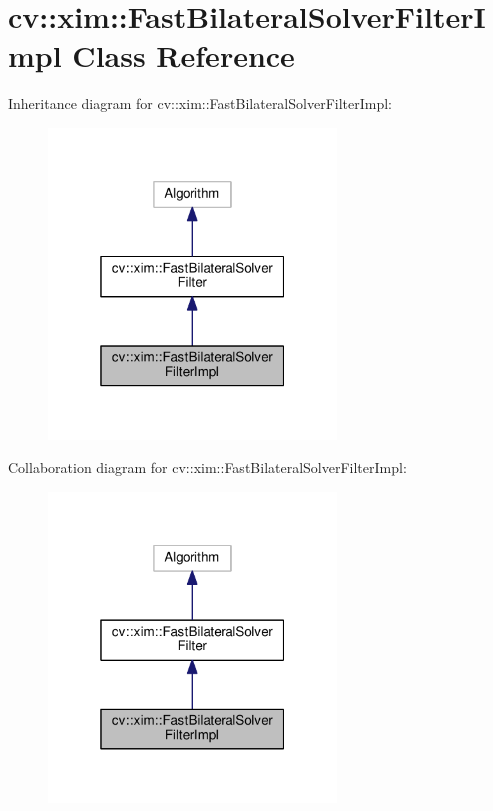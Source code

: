 \hypertarget{classcv_1_1xim_1_1FastBilateralSolverFilterImpl}{}\section{cv\+:\+:xim\+:\+:Fast\+Bilateral\+Solver\+Filter\+Impl Class Reference}
\label{classcv_1_1xim_1_1FastBilateralSolverFilterImpl}


Inheritance diagram for cv\+:\+:xim\+:\+:Fast\+Bilateral\+Solver\+Filter\+Impl\+:
\nopagebreak
\begin{figure}[H]
\begin{center}
\leavevmode
\includegraphics[width=217pt]{classcv_1_1xim_1_1FastBilateralSolverFilterImpl__inherit__graph}
\end{center}
\end{figure}


Collaboration diagram for cv\+:\+:xim\+:\+:Fast\+Bilateral\+Solver\+Filter\+Impl\+:
\nopagebreak
\begin{figure}[H]
\begin{center}
\leavevmode
\includegraphics[width=217pt]{classcv_1_1xim_1_1FastBilateralSolverFilterImpl__coll__graph}
\end{center}
\end{figure}
